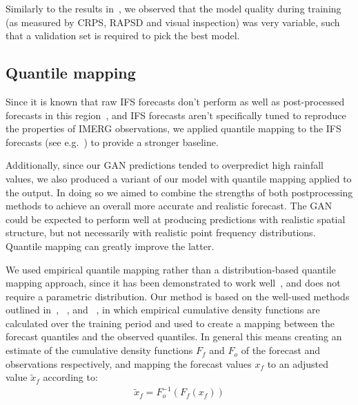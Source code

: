 \documentclass{article}
\begin{document}
Similarly to the results in~\cite{harris_generative_2022}, we observed that the model quality during training (as measured by CRPS, RAPSD and visual inspection) was very variable, such that a validation set is required to pick the best model. 

\subsection{Quantile mapping}
\label{subsec:qm}
Since it is known that raw IFS forecasts don't perform as well as post-processed forecasts in this region~\citep{vogel_skill_2018}, and IFS forecasts aren't specifically tuned to reproduce the properties of IMERG observations, we applied quantile mapping to the IFS forecasts (see e.g.~\cite{maraun_model_2017}) to provide a stronger baseline. 

Additionally, since our GAN predictions tended to overpredict high rainfall values, we also produced a variant of our model with quantile mapping applied to the output. In doing so we aimed to combine the strengths of both postprocessing methods to achieve an overall more accurate and realistic forecast. The GAN could be expected to perform well at producing predictions with realistic spatial structure, but not necessarily with realistic point frequency distributions. Quantile mapping can greatly improve the latter.


We used empirical quantile mapping rather than a distribution-based quantile mapping approach, since it has been demonstrated to work well~\citep{gudmundsson_quantile_2012}, and does not require a parametric distribution. Our method is based on the well-used methods outlined in~\cite{boe_statistical_2007}, ~\citet{deque_frequency_2007}, and ~\citet{maraun_model_2017}, in which empirical cumulative density functions are calculated over the training period and used to create a mapping between the forecast quantiles and the observed quantiles. In general this means creating an estimate of the cumulative density functions $F_{f}$ and $F_{o}$ of the forecast and observations respectively, and mapping the forecast values $x_{f}$ to an adjusted value $\tilde{x}_f$ according to:
\begin{align}
    \tilde{x}_f = F^{-1}_o (F_f (x_f))
\end{align}
\end{document}
